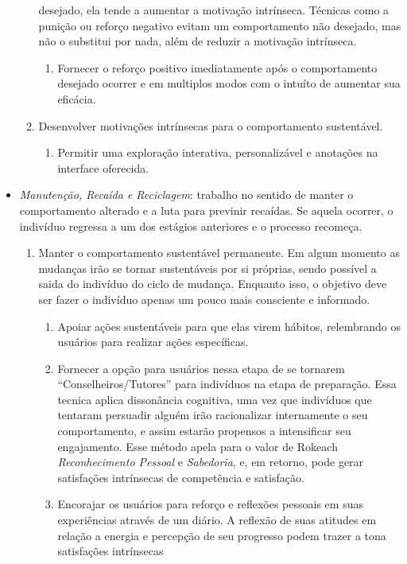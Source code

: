 \begin{itemize}
\begin{enumerate}
desejado, ela tende a aumentar a motivação intrínseca. Técnicas como a punição ou 
reforço negativo evitam um comportamento não desejado, mas não o substitui por
nada, além de reduzir a motivação intrínseca.
\begin{enumerate}
\item Fornecer o reforço positivo imediatamente após o comportamento desejado
ocorrer e em multiplos modos com o intuíto de aumentar sua eficácia.
\end{enumerate}
\item Desenvolver motivações intrínsecas para o comportamento sustentável.
\begin{enumerate}
\item Permitir uma exploração interativa, personalizável e anotações na
interface oferecida.
\end{enumerate}
\end{enumerate}
\item \emph{Manutenção, Recaída e Reciclagem}: trabalho no sentido de manter o
comportamento alterado e a luta para previnir recaídas. Se aquela ocorrer, o
indivíduo regressa a um dos estágios anteriores e o processo recomeça.
\begin{enumerate}
\item Manter o comportamento sustentável permanente. Em algum momento as
mudanças irão se tornar sustentáveis por si próprias, sendo possível a saida 
do indivíduo do ciclo de mudança. Enquanto isso, o objetivo deve ser fazer o
indivíduo apenas um pouco mais consciente e informado.
\begin{enumerate}
\item Apoiar ações sustentáveis para que elas virem hábitos, relembrando os
usuários para realizar ações específicas.
\item Fornecer a opção para usuários nessa etapa de se tornarem
``Conselheiros/Tutores'' para indivíduos na etapa de preparação. Essa tecnica
aplica dissonância cognitiva, uma vez que indivíduos que tentaram persuadir
alguém irão racionalizar internamente o seu comportamento, e assim estarão
propensos a intensificar seu engajamento. Esse método apela para o valor de
Rokeach \emph{Reconhecimento Pessoal} e \emph{Sabedoria}, e, em retorno, pode
gerar satisfações intrínsecas de competência e satisfação.
\item Encorajar os usuários para reforço e reflexões pessoais em suas
experiências através de um diário. A reflexão de suas atitudes em relação a
energia e percepção de seu progresso podem trazer a tona satisfações intrínsecas

\end{enumerate}
\end{enumerate}
\end{itemize}
